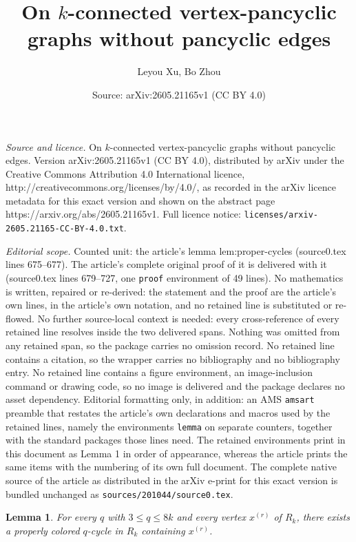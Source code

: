 \documentclass[10pt,a4paper]{amsart}
\title{On $k$-connected vertex-pancyclic graphs without pancyclic edges}
\author{Leyou Xu, Bo Zhou}
\date{Source: arXiv:2605.21165v1 (CC BY 4.0)}
\newtheorem{lemma}{Lemma}
\begin{document}
\maketitle

\noindent\emph{Source and licence.} On $k$-connected vertex-pancyclic graphs without pancyclic edges. Version arXiv:2605.21165v1 (CC BY 4.0), distributed by arXiv under the Creative Commons Attribution 4.0 International licence, http://creativecommons.org/licenses/by/4.0/, as recorded in the arXiv licence metadata for this exact version and shown on the abstract page https://arxiv.org/abs/2605.21165v1. Full licence notice: \texttt{licenses/arxiv-2605.21165-CC-BY-4.0.txt}.\par\smallskip

\noindent\textit{Editorial scope.} Counted unit: the article's lemma lem:proper-cycles (source0.tex lines 675--677). The article's complete original proof of it is delivered with it (source0.tex lines 679--727, one \texttt{proof} environment of 49 lines). No mathematics is written, repaired or re-derived: the statement and the proof are the article's own lines, in the article's own notation, and no retained line is substituted or re-flowed.  No further source-local context is needed: every cross-reference of every retained line resolves inside the two delivered spans.  Nothing was omitted from any retained span, so the package carries no omission record.  No retained line contains a citation, so the wrapper carries no bibliography and no bibliography entry.  No retained line contains a figure environment, an image-inclusion command or drawing code, so no image is delivered and the package declares no asset dependency.  Editorial formatting only, in addition: an AMS \texttt{amsart} preamble that restates the article's own declarations and macros used by the retained lines, namely the environments \texttt{lemma} on separate counters, together with the standard packages those lines need.  The retained environments print in this document as Lemma 1 in order of appearance, whereas the article prints the same items with the numbering of its own full document.  The complete native source of the article as distributed in the arXiv e-print for this exact version is bundled unchanged as \texttt{sources/201044/source0.tex}.
\begin{lemma}\label{lem:proper-cycles}
For every $q$ with $3\le q\le 8k$ and every vertex $x^{(r)}$ of $R_k$, there exists a properly colored $q$-cycle in $R_k$ containing $x^{(r)}$.
\end{lemma}
\end{document}
